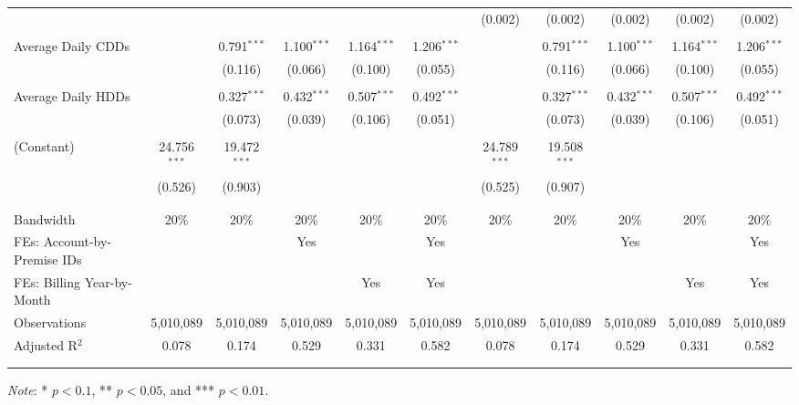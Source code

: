 {\begin{table}[t!]
\begin{adjustbox}{scale = 0.8}
\begin{threeparttable}
\begin{tabular}{@{\extracolsep{-1.5pt}}lcccccccccc}
                    &  &  &  &  &  & (0.002) & (0.002) & (0.002) & (0.002) & (0.002) \\
                    & & & & & & & & & & \\
                    Average Daily CDDs &  & 0.791$^{***}$ & 1.100$^{***}$ & 1.164$^{***}$ & 1.206$^{***}$ &  & 0.791$^{***}$ & 1.100$^{***}$ & 1.164$^{***}$ & 1.206$^{***}$ \\
                    &  & (0.116) & (0.066) & (0.100) & (0.055) &  & (0.116) & (0.066) & (0.100) & (0.055) \\
                    & & & & & & & & & & \\
                    Average Daily HDDs &  & 0.327$^{***}$ & 0.432$^{***}$ & 0.507$^{***}$ & 0.492$^{***}$ &  & 0.327$^{***}$ & 0.432$^{***}$ & 0.507$^{***}$ & 0.492$^{***}$ \\
                    &  & (0.073) & (0.039) & (0.106) & (0.051) &  & (0.073) & (0.039) & (0.106) & (0.051) \\
                    & & & & & & & & & & \\
                    (Constant) & 24.756$^{***}$ & 19.472$^{***}$ &  &  &  & 24.789$^{***}$ & 19.508$^{***}$ &  &  &  \\
                    & (0.526) & (0.903) &  &  &  & (0.525) & (0.907) &  &  &  \\
                    & & & & & & & & & & \\
                    \hline
                    \\[-2.0ex]
                    Bandwidth & 20\% & 20\% & 20\% & 20\% & 20\% & 20\% & 20\% & 20\% & 20\% & 20\% \\
                    FEs: Account-by-Premise IDs &  &  & Yes &  & Yes &  &  & Yes &  & Yes \\
                    FEs: Billing Year-by-Month &  &  &  & Yes & Yes &  &  &  & Yes & Yes \\
                    Observations & 5,010,089 & 5,010,089 & 5,010,089 & 5,010,089 & 5,010,089 & 5,010,089 & 5,010,089 & 5,010,089 & 5,010,089 & 5,010,089 \\
                    Adjusted R$^{2}$ & 0.078 & 0.174 & 0.529 & 0.331 & 0.582 & 0.078 & 0.174 & 0.529 & 0.331 & 0.582 \\
                    \\[-2.0ex]
                    \hline \hline
                    \\[-4.5ex]
                \end{tabular}
                \begin{tablenotes}[flushleft]
                    \footnotesize
                    \item \textit{Note}: * $p < 0.1$, ** $p < 0.05$, and *** $p < 0.01$.
                \end{tablenotes}
            \end{threeparttable}
        \end{adjustbox}
    \end{table}
}
